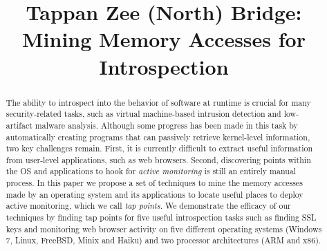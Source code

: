 \documentclass{sig-alternate}
\begin{document}
\date{}

\title{Tappan Zee (North) Bridge: Mining Memory Accesses for Introspection}

%

\maketitle


\begin{abstract}

The ability to introspect into the behavior of software at runtime is
crucial for many security-related tasks, such as virtual machine-based
intrusion detection and low-artifact malware analysis. Although some
progress has been made in this task by automatically creating programs
that can passively retrieve kernel-level information, two key challenges
remain. First, it is currently difficult to extract useful information
from user-level applications, such as web browsers. Second, discovering
points within the OS and applications to hook for \emph{active
monitoring} is still an entirely manual process. In this paper we
propose a set of techniques to mine the memory accesses made by an
operating system and its applications to locate useful places to deploy
active monitoring, which we call \emph{tap points}. We demonstrate the
efficacy of our techniques by finding tap points for five useful
introspection tasks such as finding SSL keys and monitoring web browser
activity on five different operating systems (Windows 7, Linux, FreeBSD,
Minix and Haiku) and two processor architectures (ARM and x86).

\end{abstract}























\end{document}
